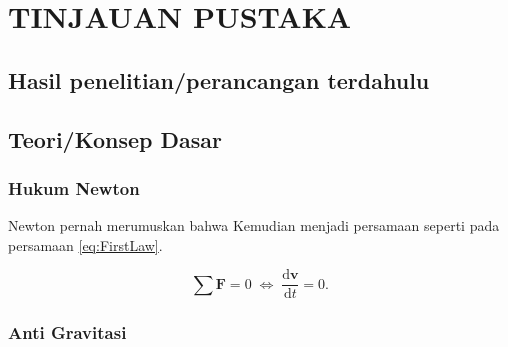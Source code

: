 \section{TINJAUAN PUSTAKA}

\subsection{Hasil penelitian/perancangan terdahulu}
\lipsum[3]

\subsection{Teori/Konsep Dasar}

\subsubsection{Hukum Newton}

Newton pernah merumuskan \parencite{Newton1687} bahwa \lipsum[8]
Kemudian menjadi persamaan seperti pada persamaan \ref{eq:FirstLaw}.

\begin{equation}
  \label{eq:FirstLaw}
  \sum \mathbf{F} = 0\; \Leftrightarrow\; \frac{\mathrm{d} \mathbf{v} }{\mathrm{d}t} = 0.
\end{equation}

\lipsum[9]

\subsubsection{Anti Gravitasi}

\lipsum[10]
